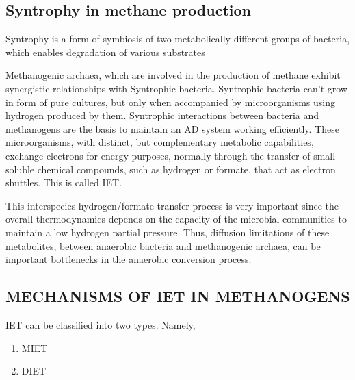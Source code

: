 \documentclass[fontsize=12pt,headsepline=true, bibliography=totocnumbered, twoside]{scrbook} %
\begin{document}
\subsection{Syntrophy in methane production}

Syntrophy is a form of symbiosis of two metabolically different groups of bacteria, which enables degradation of various substrates\citep{zieminski2012methane}


Methanogenic archaea, which are involved in the production of methane exhibit synergistic relationships with Syntrophic bacteria. Syntrophic bacteria can't grow in form of pure cultures, but only when accompanied by microorganisms using hydrogen produced by them. Syntrophic interactions between bacteria and methanogens are the basis to maintain an \ac{AD} system working efficiently. These microorganisms, with distinct, but complementary metabolic capabilities, exchange electrons for energy purposes, normally through the transfer of small soluble chemical compounds, such as hydrogen or formate, that act as electron shuttles. This is called \ac{IET}.\citep{zieminski2012methane}

This interspecies hydrogen/formate transfer process is very important since the overall thermodynamics depends on the capacity of the microbial communities to maintain a low hydrogen partial pressure. Thus, diffusion limitations of these metabolites, between anaerobic bacteria and methanogenic archaea, can be important bottlenecks in the anaerobic conversion process.\citep{martins2018methane}





 





\subsection[Electron transfer mechanisms]{MECHANISMS OF \ac{IET} IN METHANOGENS}

 
   
   \acf{IET} can be classified into two types. Namely,
   
   \begin{enumerate}
   \item \ac{MIET}
   \item \ac{DIET}
   \end{enumerate}
\end{document}
